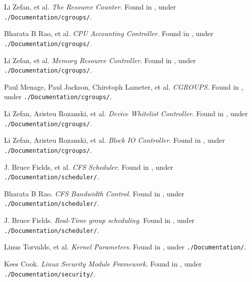 \begin{thebibliography}{9}
Li Zefan, et al.  \emph{The Resource Counter}. Found in
\cite{linux-kernel-v3.14.2}, under \texttt{./Documentation/cgroups/}.


Bharata B Rao, et al. \emph{CPU Accounting Controller}.  Found in
\cite{linux-kernel-v3.14.2}, under \texttt{./Documentation/cgroups/}.


Li Zefan, et al.  \emph{Memory Resource Controller}. Found in
\cite{linux-kernel-v3.14.2}, under \texttt{./Documentation/cgroups/}.


Paul Menage, Paul Jackson, Chirstoph Lameter, et al. \emph{CGROUPS}.  Found in
\cite{linux-kernel-v3.14.2}, under \texttt{./Documentation/cgroups/}.


Li Zefan, Aristeu Rozanski, et al. \emph{Device Whitelist Controller}.  Found
in \cite{linux-kernel-v3.14.2}, under \texttt{./Documentation/cgroups/}.


Li Zefan, Aristeu Rozanski, et al. \emph{Block IO Controller}.  Found
in \cite{linux-kernel-v3.14.2}, under \texttt{./Documentation/cgroups/}.



J. Bruce Fields, et al. \emph{CFS Scheduler}.  Found in
\cite{linux-kernel-v3.14.2}, under \texttt{./Documentation/scheduler/}.


Bharata B Rao. \emph{CFS Bandwidth Control}.  Found in
\cite{linux-kernel-v3.14.2}, under \texttt{./Documentation/scheduler/}.


J. Bruce Fields. \emph{Real-Time group scheduling}.  Found in
\cite{linux-kernel-v3.14.2}, under \texttt{./Documentation/scheduler/}.


Linus Torvalds, et al. \emph{Kernel Parameters}. Found in
\cite{linux-kernel-v3.14.2}, under \texttt{./Documentation/}.


Kees Cook. \emph{Linux Security Module Framework}. Found in
\cite{linux-kernel-v3.14.2}, under \texttt{./Documentation/security/}.

\end{thebibliography}
